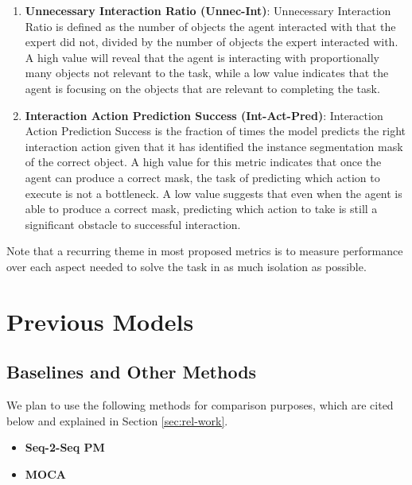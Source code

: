 \documentclass[11pt,a4paper]{article}
\begin{document}
\begin{enumerate}
    \item \textbf{Unnecessary Interaction Ratio (Unnec-Int)}: Unnecessary Interaction Ratio is defined as the number of  objects the agent interacted with that the expert did not, divided by the number of objects the expert interacted with. A high value will reveal that the agent is interacting with proportionally many objects not relevant to the task, while a low value indicates that the agent is focusing on the objects that are relevant to completing the task.
    
    \item \textbf{Interaction Action Prediction Success (Int-Act-Pred)}: Interaction Action Prediction Success is the fraction of times the model predicts the right interaction action given that it has identified the instance segmentation mask of the correct object. A high value for this metric indicates that once the agent can produce a correct mask, the task of predicting which action to execute is not a bottleneck. A low value suggests that even when the agent is able to produce a correct mask, predicting which action to take is still a significant obstacle to successful interaction.
\end{enumerate}

Note that a recurring theme in most proposed metrics is to measure performance over each aspect needed to solve the task in as much isolation as possible. %



\section{Previous Models}
\label{sec:prev-models}
\subsection{Baselines and Other Methods}
\label{sssec:baselines}
We plan to use the following methods for comparison purposes, which are cited below and explained in Section \ref{sec:rel-work}.

\begin{itemize}
\item \textbf{Seq-2-Seq PM} \cite{shridhar2020alfred} 
\item \textbf{MOCA} \cite{singh2020moca}
\end{itemize}
\end{document}
